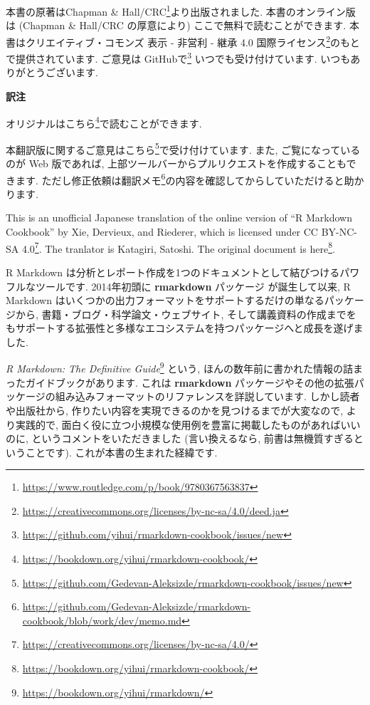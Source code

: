 \documentclass[
  11pt,
  lualatex,ja=standard,jafont=noto]{bxjsreport}
\newenvironment{infobox}[1]{\begin{itemize}\renewcommand{\labelitemi}{\raisebox{-.7\height}[0pt][0pt]{%
  {\setkeys{Gin}{width=3em,keepaspectratio}\texttt{[image: \_latex/\_img/\#1]}}}}
  \setlength{\fboxsep}{1em}
  \begin{greyblock}
  \item
  }{\end{greyblock}\end{itemize}
}
\renewcommand{\href}[2]{#2\footnote{\url{#1}}}
\begin{document}
\begin{infobox}{caution}
本書の原著は\href{https://www.routledge.com/p/book/9780367563837}{Chapman \& Hall/CRC}より出版されました. 本書のオンライン版は (Chapman \& Hall/CRC の厚意により) ここで無料で読むことができます. 本書は\href{https://creativecommons.org/licenses/by-nc-sa/4.0/deed.ja}{クリエイティブ・コモンズ 表示 - 非営利 - 継承 4.0 国際ライセンス}のもとで提供されています. ご意見は \href{https://github.com/yihui/rmarkdown-cookbook/issues/new}{GitHubで} いつでも受け付けています. いつもありがとうございます.

\begin{center}
\textbf{訳注}

\end{center}

オリジナルは\href{https://bookdown.org/yihui/rmarkdown-cookbook/}{こちら}で読むことができます.

本翻訳版に関するご意見は\href{https://github.com/Gedevan-Aleksizde/rmarkdown-cookbook/issues/new}{こちら}で受け付けています. また, ご覧になっているのが Web 版であれば, 上部ツールバーからプルリクエストを作成することもできます. ただし修正依頼は\href{https://github.com/Gedevan-Aleksizde/rmarkdown-cookbook/blob/work/dev/memo.md}{翻訳メモ}の内容を確認してからしていただけると助かります.

This is an unofficial Japanese translation of the online version of ``R Markdown Cookbook'' by Xie, Dervieux, and Riederer, which is licensed under \href{https://creativecommons.org/licenses/by-nc-sa/4.0/}{CC BY-NC-SA 4.0}. The tranlator is Katagiri, Satoshi. The original document is \href{https://bookdown.org/yihui/rmarkdown-cookbook/}{here}.

\end{infobox}

R Markdown は分析とレポート作成を1つのドキュメントとして結びつけるパワフルなツールです. 2014年初頭に \textbf{rmarkdown} パッケージ \autocite{R-rmarkdown} が誕生して以来, R Markdown はいくつかの出力フォーマットをサポートするだけの単なるパッケージから, 書籍・ブログ・科学論文・ウェブサイト, そして講義資料の作成までをもサポートする拡張性と多様なエコシステムを持つパッケージへと成長を遂げました.

\href{https://bookdown.org/yihui/rmarkdown/}{\emph{R Markdown: The Definitive Guide}} \autocite{rmarkdown2018} という, ほんの数年前に書かれた情報の詰まったガイドブックがあります. これは \textbf{rmarkdown} パッケージやその他の拡張パッケージの組み込みフォーマットのリファレンスを詳説しています. しかし読者や出版社から, 作りたい内容を実現できるのかを見つけるまでが大変なので, より実践的で, 面白く役に立つ小規模な使用例を豊富に掲載したものがあればいいのに, というコメントをいただきました (言い換えるなら, 前書は無機質すぎるということです). これが本書の生まれた経緯です.
\end{document}
